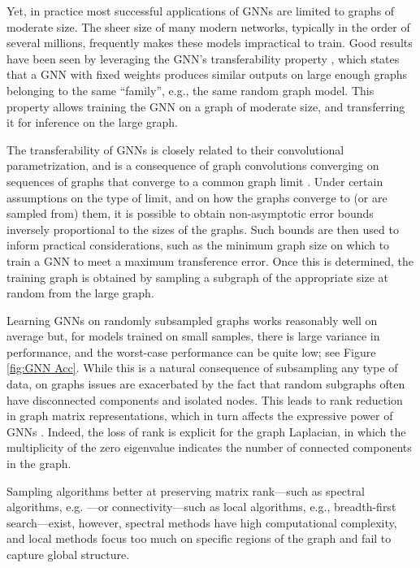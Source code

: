 \documentclass[conference]{IEEEtran}
\theoremstyle{definition}
\begin{document}
Yet, in practice most successful applications of GNNs are limited to graphs of moderate size. The sheer size of many modern networks, typically in the order of several millions, frequently makes these models impractical to train. Good results have been seen by leveraging the GNN's transferability property \cite{ruiz20-transf,levie2019transferability}, which states that a GNN with fixed weights produces similar outputs on large enough graphs belonging to the same ``family'', e.g., the same random graph model. This property allows training the GNN on a graph of moderate size, and transferring it for inference on the large graph.

The transferability of GNNs is closely related to their convolutional parametrization, and is a consequence of graph convolutions converging on sequences of graphs that converge to a common graph limit \cite{ruiz2020graphonsp}. Under certain assumptions on the type of limit, and on how the graphs converge to (or are sampled from) them, it is possible to obtain non-asymptotic error bounds inversely proportional to the sizes of the graphs. Such bounds are then used to inform practical considerations, such as the minimum graph size on which to train a GNN to meet a maximum transference error. Once this is determined, the training graph is obtained by sampling a subgraph of the appropriate size at random from the large graph.

Learning GNNs on randomly subsampled graphs works reasonably well on average but, for models trained on small samples, there is large variance in performance, and the worst-case performance can be quite low; see Figure \ref{fig:GNN Acc}. While this is a natural consequence of subsampling any type of data, on graphs issues are exacerbated by the fact that random subgraphs often have disconnected components and isolated nodes. This leads to rank reduction in graph matrix representations, which in turn affects the expressive power of GNNs \cite{ruiz2024spectral}. Indeed, the loss of rank is explicit for the graph Laplacian, in which the multiplicity of the zero eigenvalue indicates the number of connected components in the graph.

Sampling algorithms better at preserving matrix rank---such as spectral algorithms, e.g. \cite{chen2015discrete,anis2016efficient}---or connectivity---such as local algorithms, e.g., breadth-first search\cite{alimohammadi2023localgraphlimitsperspective}---exist, however, spectral methods have high computational complexity, and local methods focus too much on specific regions of the graph and fail to capture global structure.
\end{document}
